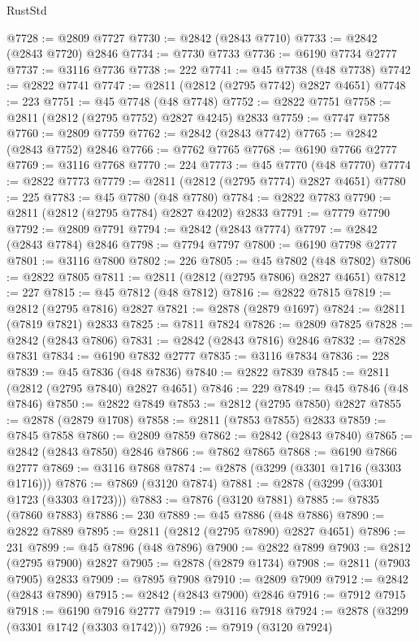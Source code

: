 \begin{lexlean}{RustStd}
\begin{coremodule}
{\begin{coremodule}
{{{{{{{{{{{{{{{{{{{{{{{{{{{{{{{{{@7728 := @2809 @7727
@7730 := @2842 (@2843 @7710)
@7733 := @2842 (@2843 @7720) @2846
@7734 := @7730 @7733
@7736 := @6190 @7734 @2777
@7737 := @3116 @7736
@7738 := 222
@7741 := @45 @7738 (@48 @7738)
@7742 := @2822 @7741
@7747 := @2811 (@2812 (@2795 @7742) @2827 @4651)
@7748 := 223
@7751 := @45 @7748 (@48 @7748)
@7752 := @2822 @7751
@7758 := @2811 (@2812 (@2795 @7752) @2827 @4245) @2833
@7759 := @7747 @7758
@7760 := @2809 @7759
@7762 := @2842 (@2843 @7742)
@7765 := @2842 (@2843 @7752) @2846
@7766 := @7762 @7765
@7768 := @6190 @7766 @2777
@7769 := @3116 @7768
@7770 := 224
@7773 := @45 @7770 (@48 @7770)
@7774 := @2822 @7773
@7779 := @2811 (@2812 (@2795 @7774) @2827 @4651)
@7780 := 225
@7783 := @45 @7780 (@48 @7780)
@7784 := @2822 @7783
@7790 := @2811 (@2812 (@2795 @7784) @2827 @4202) @2833
@7791 := @7779 @7790
@7792 := @2809 @7791
@7794 := @2842 (@2843 @7774)
@7797 := @2842 (@2843 @7784) @2846
@7798 := @7794 @7797
@7800 := @6190 @7798 @2777
@7801 := @3116 @7800
@7802 := 226
@7805 := @45 @7802 (@48 @7802)
@7806 := @2822 @7805
@7811 := @2811 (@2812 (@2795 @7806) @2827 @4651)
@7812 := 227
@7815 := @45 @7812 (@48 @7812)
@7816 := @2822 @7815
@7819 := @2812 (@2795 @7816) @2827
@7821 := @2878 (@2879 @1697)
@7824 := @2811 (@7819 @7821) @2833
@7825 := @7811 @7824
@7826 := @2809 @7825
@7828 := @2842 (@2843 @7806)
@7831 := @2842 (@2843 @7816) @2846
@7832 := @7828 @7831
@7834 := @6190 @7832 @2777
@7835 := @3116 @7834
@7836 := 228
@7839 := @45 @7836 (@48 @7836)
@7840 := @2822 @7839
@7845 := @2811 (@2812 (@2795 @7840) @2827 @4651)
@7846 := 229
@7849 := @45 @7846 (@48 @7846)
@7850 := @2822 @7849
@7853 := @2812 (@2795 @7850) @2827
@7855 := @2878 (@2879 @1708)
@7858 := @2811 (@7853 @7855) @2833
@7859 := @7845 @7858
@7860 := @2809 @7859
@7862 := @2842 (@2843 @7840)
@7865 := @2842 (@2843 @7850) @2846
@7866 := @7862 @7865
@7868 := @6190 @7866 @2777
@7869 := @3116 @7868
@7874 := @2878 (@3299 (@3301 @1716 (@3303 @1716)))
@7876 := @7869 (@3120 @7874)
@7881 := @2878 (@3299 (@3301 @1723 (@3303 @1723)))
@7883 := @7876 (@3120 @7881)
@7885 := @7835 (@7860 @7883)
@7886 := 230
@7889 := @45 @7886 (@48 @7886)
@7890 := @2822 @7889
@7895 := @2811 (@2812 (@2795 @7890) @2827 @4651)
@7896 := 231
@7899 := @45 @7896 (@48 @7896)
@7900 := @2822 @7899
@7903 := @2812 (@2795 @7900) @2827
@7905 := @2878 (@2879 @1734)
@7908 := @2811 (@7903 @7905) @2833
@7909 := @7895 @7908
@7910 := @2809 @7909
@7912 := @2842 (@2843 @7890)
@7915 := @2842 (@2843 @7900) @2846
@7916 := @7912 @7915
@7918 := @6190 @7916 @2777
@7919 := @3116 @7918
@7924 := @2878 (@3299 (@3301 @1742 (@3303 @1742)))
@7926 := @7919 (@3120 @7924)
}}}}}}}}}}}}}}}}}}}}}}}}}}}}}}}}}
\end{coremodule}}
\end{coremodule}
\end{lexlean}
